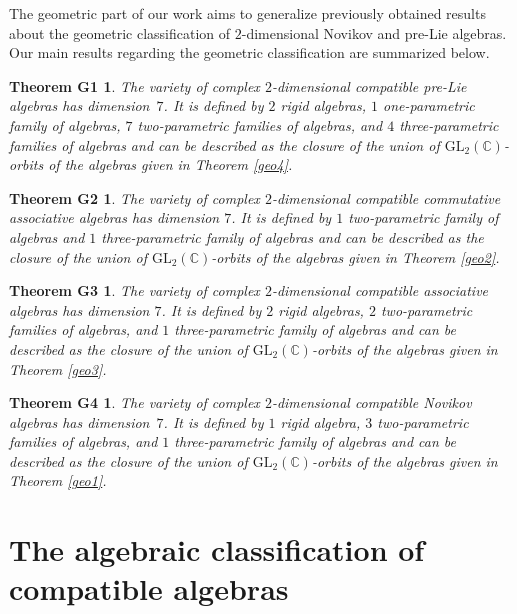 \documentclass[pdftex]{sigma}
\numberwithin{equation}{section}
\newtheorem*{theoremG1}{Theorem G1}
\newtheorem*{theoremG2}{Theorem G2}
\newtheorem*{theoremG3}{Theorem G3}
\newtheorem*{theoremG4}{Theorem G4}
\begin{document}
The geometric part of our work aims to generalize previously obtained results about the geometric classification of $2$-dimensional Novikov \cite{BB14} and pre-Lie \cite{BB09} algebras. Our main results regarding the geometric classification are summarized below.

\begin{theoremG1}
The variety of complex $2$-dimensional compatible pre-Lie algebras has dimension~$7$.
It is defined by $2$ rigid algebras,
$1$ one-parametric family of algebras,
$7$ two-parametric families of algebras,
and $4$ three-parametric families of algebras and can be described as the closure of the union of $\mathrm{GL}_2(\mathbb{C})$-orbits of the algebras given in Theorem {\rm\ref{geo4}}.
\end{theoremG1}

\begin{theoremG2}
The variety of complex $2$-dimensional compatible commutative associative algebras has dimension $7$.
It is defined by
$1$ two-parametric family of algebras
and $1$ three-parametric family of algebras and can be described as the closure of the union of $\mathrm{GL}_2(\mathbb{C})$-orbits of the algebras given in Theorem {\rm\ref{geo2}}.
\end{theoremG2}

\begin{theoremG3}
The variety of complex $2$-dimensional compatible associative algebras has dimension $7$.
It is defined by $2$ rigid algebras,
$2$ two-parametric families of algebras,
and $1$ three-parametric family of algebras and can be described as the closure of the union of $\mathrm{GL}_2(\mathbb{C})$-orbits of the algebras given in Theorem {\rm\ref{geo3}}.
\end{theoremG3}

 \begin{theoremG4}
The variety of complex $2$-dimensional compatible Novikov algebras has dimension~$7$.
It is defined by $1$ rigid algebra,
$3$ two-parametric families of algebras,
and $1$ three-parametric family of algebras and can be described as the closure of the union of $\mathrm{GL}_2(\mathbb{C})$-orbits of the algebras given in Theorem {\rm\ref{geo1}}.
\end{theoremG4}

\section{The algebraic classification of compatible algebras}
\end{document}
